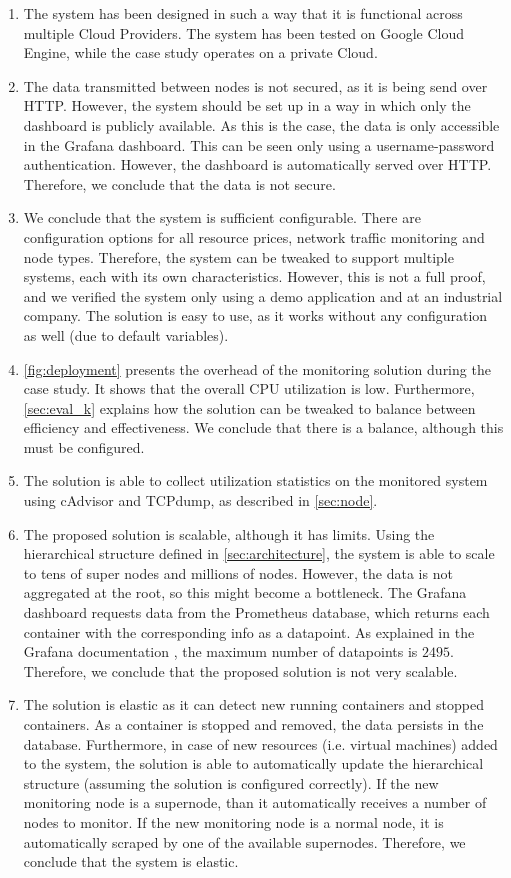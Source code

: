 \begin{enumerate}
    \item The system has been designed in such a way that it is functional across multiple Cloud Providers. The system has been tested on Google Cloud Engine, while the case study operates on a private Cloud.
    \item The data transmitted between nodes is not secured, as it is being send over HTTP. However, the system should be set up in a way in which only the dashboard is publicly available. As this is the case, the data is only accessible in the Grafana dashboard. This can be seen only using a username-password authentication. However, the dashboard is automatically served over HTTP. Therefore, we conclude that the data is not secure.
    \item We conclude that the system is sufficient configurable. There are configuration options for all resource prices, network traffic monitoring and node types. Therefore, the system can be tweaked to support multiple systems, each with its own characteristics. However, this is not a full proof, and we verified the system only using a demo application and at an industrial company. The solution is easy to use, as it works without any configuration as well (due to default variables).
    \item \autoref{fig:deployment} presents the overhead of the monitoring solution during the case study. It shows that the overall CPU utilization is low. Furthermore, \autoref{sec:eval_k} explains how the solution can be tweaked to balance between efficiency and effectiveness. We conclude that there is a balance, although this must be configured.
    \item The solution is able to collect utilization statistics on the monitored system using cAdvisor and TCPdump, as described in \autoref{sec:node}.
    \item The proposed solution is scalable, although it has limits. Using the hierarchical structure defined in \autoref{sec:architecture}, the system is able to scale to tens of super nodes and millions of nodes. However, the data is not aggregated at the root, so this might become a bottleneck. The Grafana dashboard requests data from the Prometheus database, which returns each container with the corresponding info as a datapoint. As explained in the Grafana documentation \cite{grafana}, the maximum number of datapoints is $2495$. Therefore, we conclude that the proposed solution is not very scalable.
    \item The solution is elastic as it can detect new running containers and stopped containers. As a container is stopped and removed, the data persists in the database. Furthermore, in case of new resources (i.e. virtual machines) added to the system, the solution is able to automatically update the hierarchical structure (assuming the solution is configured correctly). If the new monitoring node is a supernode, than it automatically receives a number of nodes to monitor. If the new monitoring node is a normal node, it is automatically scraped by one of the available supernodes. Therefore, we conclude that the system is elastic.

\end{enumerate}
